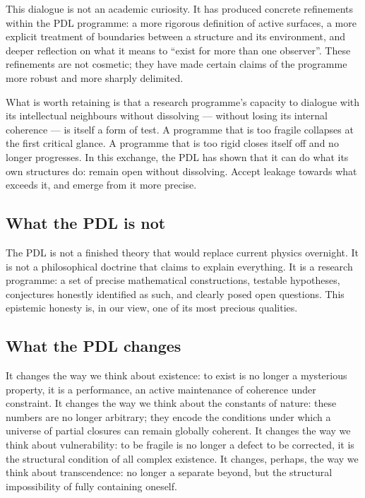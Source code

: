 \documentclass[11pt, a4paper, openright]{book}
\begin{document}
\medskip

This dialogue is not an academic curiosity. It has produced concrete refinements within the PDL programme: a more rigorous definition of active surfaces, a more explicit treatment of boundaries between a structure and its environment, and deeper reflection on what it means to “exist for more than one observer”. These refinements are not cosmetic; they have made certain claims of the programme more robust and more sharply delimited.

\medskip

What is worth retaining is that a research programme’s capacity to dialogue with its intellectual neighbours without dissolving — without losing its internal coherence — is itself a form of test. A programme that is too fragile collapses at the first critical glance. A programme that is too rigid closes itself off and no longer progresses. In this exchange, the PDL has shown that it can do what its own structures do: remain open without dissolving. Accept leakage towards what exceeds it, and emerge from it more precise.

\subsection*{What the PDL is not}

The PDL is not a finished theory that would replace current physics overnight. It is not a philosophical doctrine that claims to explain everything. It is a research programme: a set of precise mathematical constructions, testable hypotheses, conjectures honestly identified as such, and clearly posed open questions. This epistemic honesty is, in our view, one of its most precious qualities.

\subsection*{What the PDL changes}

It changes the way we think about existence: to exist is no longer a mysterious property, it is a performance, an active maintenance of coherence under constraint. It changes the way we think about the constants of nature: these numbers are no longer arbitrary; they encode the conditions under which a universe of partial closures can remain globally coherent. It changes the way we think about vulnerability: to be fragile is no longer a defect to be corrected, it is the structural condition of all complex existence. It changes, perhaps, the way we think about transcendence: no longer a separate beyond, but the structural impossibility of fully containing oneself.
\end{document}
